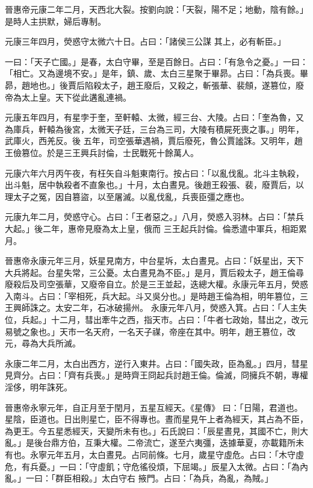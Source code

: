 
\begin{pinyinscope}

 晉惠帝元康二年二月，天西北大裂。按劉向說：「天裂，陽不足；地動，陰有餘。」是時人主拱默，婦后專制。



 元康三年四月，熒惑守太微六十日。占曰：「諸侯三公謀
 其上，必有斬臣。」



 一曰：「天子亡國。」是春，太白守畢，至是百餘日。占曰：「有急令之憂。」一曰：「相亡。又為邊境不安。」是年，鎮、歲、太白三星聚于畢昴。占曰：「為兵喪。畢昴，趙地也。」後賈后陷殺太子，趙王廢后，又殺之，斬張華、裴頠，遂篡位，廢帝為太上皇。天下從此遘亂連禍。



 元康五年四月，有星孛于奎，至軒轅、太微，經三台、大陵。占曰：「奎為魯，又為庫兵，軒轅為後宮，太微天子廷，三台為三司，大陵有積屍死喪之事。」明年，武庫火，西羌反。後
 五年，司空張華遇禍，賈后廢死，魯公賈謐誅。又明年，趙王儉篡位。於是三王興兵討倫，士民戰死十餘萬人。



 元康六年六月丙午夜，有枉矢自斗魁東南行。按占曰：「以亂伐亂。北斗主執殺，出斗魁，居中執殺者不直象也。」十月，太白晝見。後趙王殺張、裴，廢賈后，以理太子之冤，因自篡盜，以至屠滅。以亂伐亂，兵喪臣彊之應也。



 元康九年二月，熒惑守心。占曰：「王者惡之。」八月，熒惑入羽林。占曰：「禁兵大起。」後二年，惠帝見廢為太上皇，俄而
 三王起兵討倫。倫悉遣中軍兵，相距累月。



 晉惠帝永康元年三月，妖星見南方，中台星坼，太白晝見。占曰：「妖星出，天下大兵將起。台星失常，三公憂。太白晝見為不臣。」是月，賈后殺太子，趙王倫尋廢殺后及司空張華，又廢帝自立。於是三王並起，迭總大權。永康元年五月，熒惑入南斗。占曰：「宰相死，兵大起。斗又吳分也。」是時趙王倫為相，明年篡位，三王興師誅之。太安二年，石冰破揚州。
 永康元年八月，熒惑入箕。占曰：「人主失位，兵起。」十二月，彗出牽牛之西，指天市。占曰：「牛者七政始，彗出之，改元易號之象也。」天市一名天府，一名天子禖，帝座在其中。明年，趙王篡位，改元，尋為大兵所滅。



 永康二年二月，太白出西方，逆行入東井。占曰：「國失政，臣為亂。」四月，彗星見齊分。占曰：「齊有兵喪。」是時齊王冏起兵討趙王倫。倫滅，冏擁兵不朝，專權淫侈，明年誅死。



 晉惠帝永寧元年，自正月至于閏月，五星互經天。《星傳》
 曰：「日陽，君道也。星陰，臣道也。日出則星亡，臣不得專也。晝而星見午上者為經天，其占為不臣，為更王。今五星悉經天，天變所未有也。」石氏說曰：「辰星晝見，其國不亡，則大亂。」是後台鼎方伯，互秉大權。二帝流亡，遂至六夷彊，迭據華夏，亦載籍所未有也。永寧元年五月，太白晝見。占同前條。七月，歲星守虛危。占曰：「木守虛危，有兵憂。」一曰：「守虛飢；守危徭役煩，下屈竭。」辰星入太微。占曰：「為內亂。」一曰：「群臣相殺。」太白守右
 掖門。占曰：「為兵，為亂，為賊。」




\end{pinyinscope}
